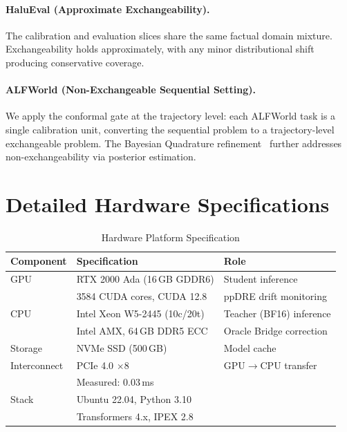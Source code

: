 \documentclass[runningheads]{article} %
\begin{document}
\paragraph{HaluEval (Approximate Exchangeability).}
The calibration and evaluation slices share the same factual domain
mixture. Exchangeability holds approximately, with any minor
distributional shift producing conservative coverage.

\paragraph{ALFWorld (Non-Exchangeable Sequential Setting).}
We apply the conformal gate at the trajectory level: each ALFWorld
task is a single calibration unit, converting the sequential problem
to a trajectory-level exchangeable problem.
The Bayesian Quadrature refinement~\cite{snell2025conformal}
further addresses non-exchangeability via posterior estimation.

\section{Detailed Hardware Specifications}
\label{app:hardware}

\begin{table}[H]
\centering
\caption{Hardware Platform Specification}
\label{tab:hardware_spec}
\begin{tabular}{@{}lll@{}}
\toprule
\textbf{Component} & \textbf{Specification} & \textbf{Role} \\
\midrule
GPU & RTX 2000 Ada (16\,GB GDDR6) & Student inference \\
    & 3584 CUDA cores, CUDA 12.8 & ppDRE drift monitoring \\
\midrule
CPU & Intel Xeon W5-2445 (10c/20t) & Teacher (BF16) inference \\
    & Intel AMX, 64\,GB DDR5 ECC & Oracle Bridge correction \\
\midrule
Storage & NVMe SSD (500\,GB) & Model cache \\
\midrule
Interconnect & PCIe 4.0 $\times$8 & GPU$\to$CPU transfer \\
             & Measured: 0.03\,ms & \\
\midrule
Stack & Ubuntu 22.04, Python 3.10 & \\
      & Transformers 4.x, IPEX 2.8 & \\
\bottomrule
\end{tabular}
\end{table}
\end{document}
